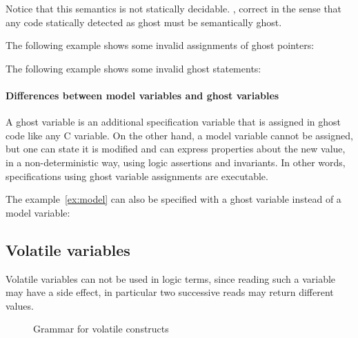 Notice that this semantics is not statically decidable.
,
correct in the sense that any code
statically detected as ghost must be semantically ghost.

\begin{example}
  The following example shows some invalid assignments of ghost pointers:
\end{example}

\begin{example}
  The following example shows some invalid ghost statements:
\end{example}

\paragraph{Differences between model variables and ghost variables}

A ghost variable is an additional specification variable that is
assigned in ghost code like any C variable. On the other hand, a model
variable cannot be assigned, but one can state it is modified and can
express properties about the new value, in a non-deterministic way,
using logic assertions and invariants.
In other words, specifications using ghost variable assignments
are executable.

\begin{example}
  \label{ex:gen_code}
  The example~\ref{ex:model} can also be specified with a ghost
  variable instead of a model variable:


\end{example}

\subsection{Volatile variables}\label{sec:volatile-variables}

Volatile variables can not be used in logic terms, since reading such
a variable may have a side effect, in particular two successive reads
may return different values.

\begin{figure}[ht]
  \begin{cadre}
      
    \end{cadre}
  \caption{Grammar for volatile constructs}
\label{fig:gram:volatile}
\end{figure}

